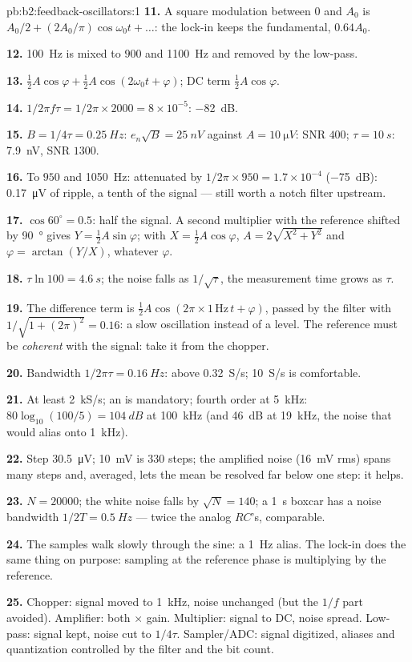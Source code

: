 \begin{solution}{pb:b2:feedback-oscillators:1}
\textbf{11.} A square modulation between $0$ and $A_0$ is $A_0/2 + (2A_0/\pi)
\cos\omega_0t + \dots$: the lock-in keeps the fundamental, $0.64A_0$.

\textbf{12.} \qty{100}{Hz} is mixed to $900$ and \qty{1100}{Hz} and removed by
the low-pass.

\textbf{13.} $\tfrac12A\cos\varphi + \tfrac12A\cos(2\omega_0t + \varphi)$; DC term $\tfrac12A\cos\varphi$.

\textbf{14.} $1/2\pi f\tau = 1/2\pi \times 2000 = 8 \times 10^{-5}$: \qty{-82}{dB}.

\textbf{15.} $B = 1/4\tau = \qty{0.25}{Hz}$: $e_n\sqrt B = \qty{25}{nV}$ against $A =
\qty{10}{\micro V}$: SNR $400$; $\tau = \qty{10}{s}$: \qty{7.9}{nV}, SNR $1300$.

\textbf{16.} To $950$ and \qty{1050}{Hz}: attenuated by $1/2\pi \times 950 = 1.7 \times
10^{-4}$ (\qty{-75}{dB}): \qty{0.17}{\micro V} of ripple, a tenth of the signal ---
still worth a notch filter upstream.

\textbf{17.} $\cos60^\circ = 0.5$: half the signal. A second multiplier with
the reference shifted by \qty{90}{\degree} gives $Y = \tfrac12A\sin\varphi$; with $X =
\tfrac12A\cos\varphi$, $A = 2\sqrt{X^2 + Y^2}$ and $\varphi = \arctan(Y/X)$, whatever $\varphi$.

\textbf{18.} $\tau\ln100 = \qty{4.6}{s}$; the noise falls as $1/\sqrt\tau$, the
measurement time grows as $\tau$.

\textbf{19.} The difference term is $\tfrac12A\cos(2\pi \times 1\,\text{Hz}\,t + \varphi)$,
passed by the filter with $1/\sqrt{1 + (2\pi)^2} = 0.16$: a slow
oscillation instead of a level. The reference must be \emph{coherent}
with the signal: take it from the chopper.

\textbf{20.} Bandwidth $1/2\pi\tau = \qty{0.16}{Hz}$: above \qty{0.32}{S/s};
\qty{10}{S/s} is comfortable.

\textbf{21.} At least \qty{2}{kS/s}; an  is mandatory;
fourth order at \qty{5}{kHz}: $80\log_{10}(100/5) = \qty{104}{dB}$ at \qty{100}{kHz}
(and \qty{46}{dB} at \qty{19}{kHz}, the noise that would alias onto \qty{1}{kHz}).

\textbf{22.} Step \qty{30.5}{\micro V}; \qty{10}{mV} is $330$ steps; the amplified
noise (\qty{16}{mV} rms) spans many steps and, averaged, lets the mean be
resolved far below one step: it helps.

\textbf{23.} $N = 20000$; the white noise falls by $\sqrt N = 140$; a
\qty{1}{s} boxcar has a noise bandwidth $1/2T = \qty{0.5}{Hz}$ --- twice the
analog $RC$'s, comparable.

\textbf{24.} The samples walk slowly through the sine: a \qty{1}{Hz} alias.
The lock-in does the same thing on purpose: sampling at the reference
phase is multiplying by the reference.

\textbf{25.} Chopper: signal moved to \qty{1}{kHz}, noise unchanged (but
the $1/f$ part avoided). Amplifier: both $\times$ gain. Multiplier: signal
to DC, noise spread. Low-pass: signal kept, noise cut to $1/4\tau$.
Sampler/ADC: signal digitized, aliases and quantization controlled by
the filter and the bit count.
\end{solution}
